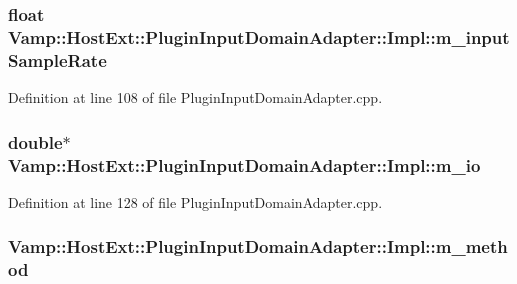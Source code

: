 \subsubsection[{\texorpdfstring{m\+\_\+input\+Sample\+Rate}{m_inputSampleRate}}]{\setlength{\rightskip}{0pt plus 5cm}float Vamp\+::\+Host\+Ext\+::\+Plugin\+Input\+Domain\+Adapter\+::\+Impl\+::m\+\_\+input\+Sample\+Rate\hspace{0.3cm}{\ttfamily [protected]}}\hypertarget{class_vamp_1_1_host_ext_1_1_plugin_input_domain_adapter_1_1_impl_abafd656a3bf6d74d6dd38def0c73cc57}{}\label{class_vamp_1_1_host_ext_1_1_plugin_input_domain_adapter_1_1_impl_abafd656a3bf6d74d6dd38def0c73cc57}


Definition at line 108 of file Plugin\+Input\+Domain\+Adapter.\+cpp.

\subsubsection[{\texorpdfstring{m\+\_\+io}{m_io}}]{\setlength{\rightskip}{0pt plus 5cm}double$\ast$ Vamp\+::\+Host\+Ext\+::\+Plugin\+Input\+Domain\+Adapter\+::\+Impl\+::m\+\_\+io\hspace{0.3cm}{\ttfamily [protected]}}\hypertarget{class_vamp_1_1_host_ext_1_1_plugin_input_domain_adapter_1_1_impl_a4d73b85b9ba00c10b55be4febc56dfc4}{}\label{class_vamp_1_1_host_ext_1_1_plugin_input_domain_adapter_1_1_impl_a4d73b85b9ba00c10b55be4febc56dfc4}


Definition at line 128 of file Plugin\+Input\+Domain\+Adapter.\+cpp.

\subsubsection[{\texorpdfstring{m\+\_\+method}{m_method}}]{ Vamp\+::\+Host\+Ext\+::\+Plugin\+Input\+Domain\+Adapter\+::\+Impl\+::m\+\_\+method\hspace{0.3cm}{\ttfamily [protected]}}\hypertarget{class_vamp_1_1_host_ext_1_1_plugin_input_domain_adapter_1_1_impl_a4a2e80b2759d63c18632fa0b04ff9860}{}\label{class_vamp_1_1_host_ext_1_1_plugin_input_domain_adapter_1_1_impl_a4a2e80b2759d63c18632fa0b04ff9860}


